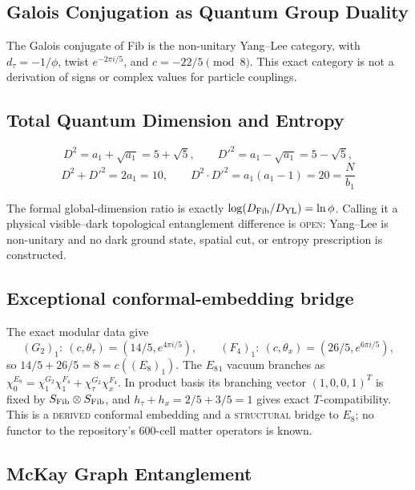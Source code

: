 \documentclass[12pt,a4paper]{article}
\theoremstyle{definition}
\begin{document}
\subsection{Galois Conjugation as Quantum Group Duality}

The Galois conjugate of Fib is the non-unitary Yang--Lee category, with \(d_\tau=-1/\phi\), twist \(e^{-2\pi i/5}\), and \(c=-22/5\pmod8\).  This exact category is not a derivation of signs or complex values for particle couplings.

\subsection{Total Quantum Dimension and Entropy}

\begin{equation}
D^2 = a_1 + \sqrt{a_1} = 5 + \sqrt{5}, \qquad D'^2 = a_1 - \sqrt{a_1} = 5 - \sqrt{5},
\end{equation}
\begin{equation}
D^2 + D'^2 = 2a_1 = 10, \qquad D^2 \cdot D'^2 = a_1(a_1 - 1) = 20 = \frac{N}{b_1}
\end{equation}

The formal global-dimension ratio is exactly
\(\log(D_{\rm Fib}/D_{\rm YL})=\ln\phi\).  Calling it a physical visible--dark topological entanglement difference is \textsc{open}: Yang--Lee is non-unitary and no dark ground state, spatial cut, or entropy prescription is constructed.

\subsection{Exceptional conformal-embedding bridge}

The exact modular data give
\[
(G_2)_1:\ (c,\theta_\tau)=(14/5,e^{4\pi i/5}),\qquad
(F_4)_1:\ (c,\theta_x)=(26/5,e^{6\pi i/5}),
\]
so \(14/5+26/5=8=c((E_8)_1)\).  The \(E_8{}_1\) vacuum branches as
\(\chi^{E_8}_0=\chi^{G_2}_1\chi^{F_4}_1+
\chi^{G_2}_\tau\chi^{F_4}_x\).  In product basis its branching vector
\((1,0,0,1)^T\) is fixed by \(S_{\rm Fib}\otimes S_{\rm Fib}\), and
\(h_\tau+h_x=2/5+3/5=1\) gives exact \(T\)-compatibility.  This is a
\textsc{derived} conformal embedding and a \textsc{structural} bridge to
\(E_8\); no functor to the repository's 600-cell matter operators is known.

\subsection{McKay Graph Entanglement}
\end{document}

